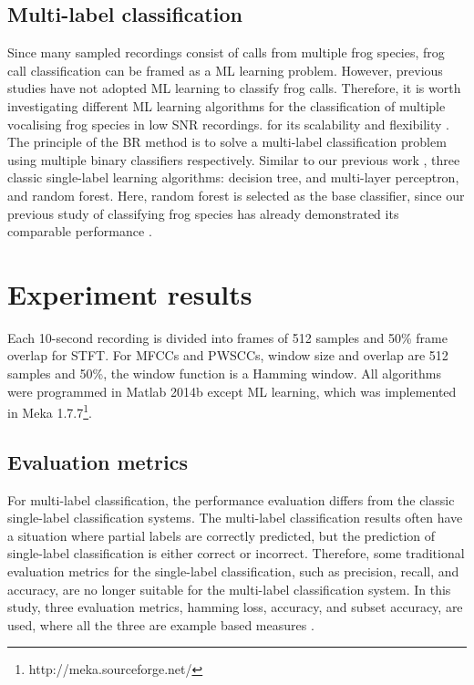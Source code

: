 \subsection{Multi-label classification} 
Since many sampled recordings consist of calls from multiple frog species, frog call classification can be framed as a ML learning problem. However, previous studies have not adopted ML learning to classify frog calls. Therefore, it is worth investigating different ML learning algorithms for the classification of multiple vocalising frog species in low SNR recordings. for its scalability and flexibility \citep{read2011classifier}. The principle of the BR method is to solve a multi-label classification problem using multiple binary classifiers respectively. Similar to our previous work \citep{zhang2016using}, 
three classic single-label learning algorithms: decision tree, and multi-layer perceptron, and random forest. Here, random forest is selected as the base classifier, since our previous study of classifying frog species has already demonstrated its comparable performance \citep{xie2016acoustic}. 

\section{Experiment results}
Each 10-second recording is divided into frames of 512 samples and 50\% frame overlap for STFT. For MFCCs and PWSCCs, window size and overlap are 512 samples and 50\%, the window function is a Hamming window. All algorithms were programmed in Matlab 2014b except ML learning, which was implemented in Meka 1.7.7\footnote[4]{http://meka.sourceforge.net/}. 







\subsection{Evaluation metrics}
For multi-label classification, the performance evaluation differs from the classic single-label classification systems. The multi-label classification results often have a situation where partial labels are correctly predicted, but the prediction of single-label classification is either correct or incorrect. Therefore, some traditional evaluation metrics for the single-label classification, such as precision, recall, and accuracy, are no longer suitable for the multi-label classification system. In this study, three evaluation metrics, hamming loss, accuracy, and subset accuracy, are used, where all the three are example based measures \citep{madjarov2012extensive}.


